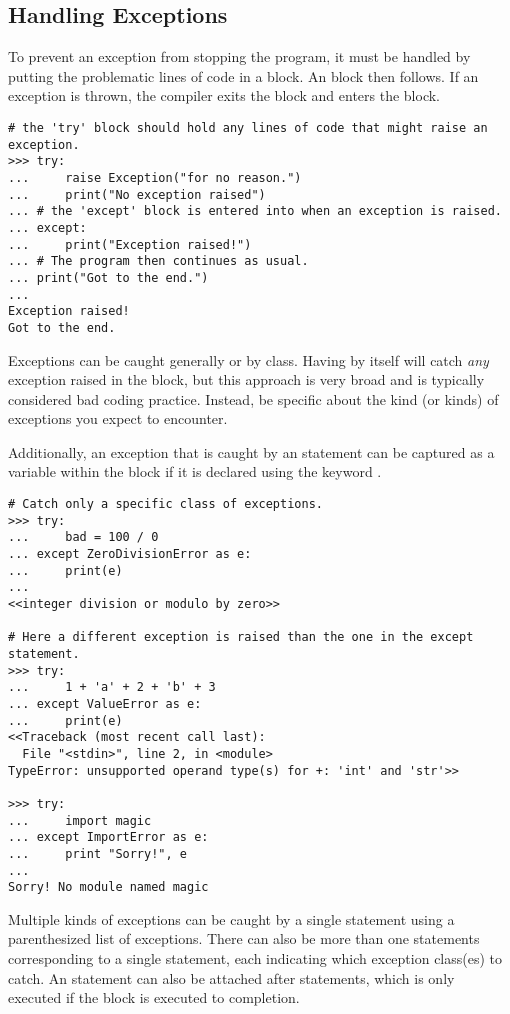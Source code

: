 \subsection*{Handling Exceptions}

To prevent an exception from stopping the program, it must be handled by
putting the problematic lines of code in a  block.
An  block then follows.
If an exception is thrown, the compiler exits the  block and enters the  block.

\begin{lstlisting}
# the 'try' block should hold any lines of code that might raise an exception.
>>> try:
...     raise Exception("for no reason.")
...     print("No exception raised")
... # the 'except' block is entered into when an exception is raised.
... except:
...     print("Exception raised!")
... # The program then continues as usual.
... print("Got to the end.")
... 
Exception raised!
Got to the end.
\end{lstlisting}

Exceptions can be caught generally or by class.
Having  by itself will catch \emph{any} exception raised in the  block, but this approach is very broad and is typically considered bad coding practice.
Instead, be specific about the kind (or kinds) of exceptions you expect to encounter.

Additionally, an exception that is caught by an  statement can be captured as a variable within the  block if it is declared using the keyword .

\begin{lstlisting}
# Catch only a specific class of exceptions.
>>> try:
...     bad = 100 / 0
... except ZeroDivisionError as e:
...     print(e)
... 
<<integer division or modulo by zero>>

# Here a different exception is raised than the one in the except statement.
>>> try:
...     1 + 'a' + 2 + 'b' + 3
... except ValueError as e:
...     print(e)
<<Traceback (most recent call last):
  File "<stdin>", line 2, in <module>
TypeError: unsupported operand type(s) for +: 'int' and 'str'>>

>>> try:
...     import magic
... except ImportError as e:
...     print "Sorry!", e
... 
Sorry! No module named magic
\end{lstlisting}

Multiple kinds of exceptions can be caught by a single  statement using a parenthesized list of exceptions.
There can also be more than one  statements corresponding to a single  statement, each indicating which exception class(es) to catch.
An  statement can also be attached after  statements, which is only executed if the  block is executed to completion.

